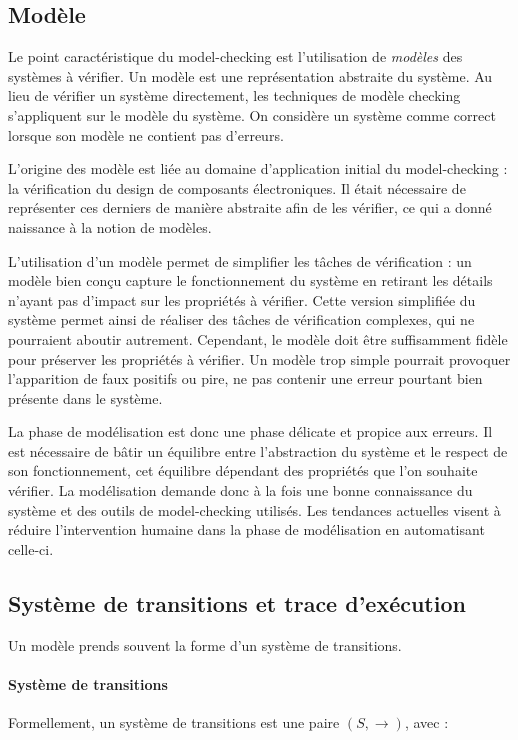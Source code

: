 \subsection{Modèle}


Le point caractéristique du model-checking est l'utilisation de
\emph{modèles} des systèmes à vérifier. Un modèle est une représentation
abstraite du système. Au lieu de vérifier un système directement, les techniques
de modèle checking s'appliquent sur le modèle du système. On considère un
système comme correct lorsque son modèle ne contient pas d'erreurs.

L'origine des modèle est liée au domaine d'application initial du
model-checking : la vérification du design de composants électroniques. Il
était nécessaire de représenter ces derniers de manière abstraite afin de les
vérifier, ce qui a donné naissance à la notion de modèles.

L'utilisation d'un modèle permet de simplifier les tâches de vérification : un
modèle bien conçu capture le fonctionnement du système en retirant les détails
n'ayant pas d'impact sur les propriétés à vérifier. Cette version simplifiée du
système permet ainsi de réaliser des tâches de vérification complexes, qui ne
pourraient aboutir autrement. Cependant, le modèle doit être suffisamment fidèle
pour préserver les propriétés à vérifier. Un modèle trop simple pourrait
provoquer l'apparition de faux positifs ou pire, ne pas contenir une erreur
pourtant bien présente dans le système.

La phase de modélisation est donc une phase délicate et propice aux erreurs. Il
est nécessaire de bâtir un équilibre entre l'abstraction du système et le
respect de son fonctionnement, cet équilibre dépendant des propriétés que l'on
souhaite vérifier. La modélisation demande donc à la fois une bonne connaissance
du système et des outils de model-checking utilisés. Les tendances actuelles
visent à réduire l'intervention humaine dans la phase de modélisation en
automatisant celle-ci.

\subsection{Système de transitions et trace d'exécution}

Un modèle prends souvent la forme d'un système de transitions.

\paragraph{Système de transitions}
Formellement, un système de transitions est une paire \((S, \rightarrow)\),
avec :


